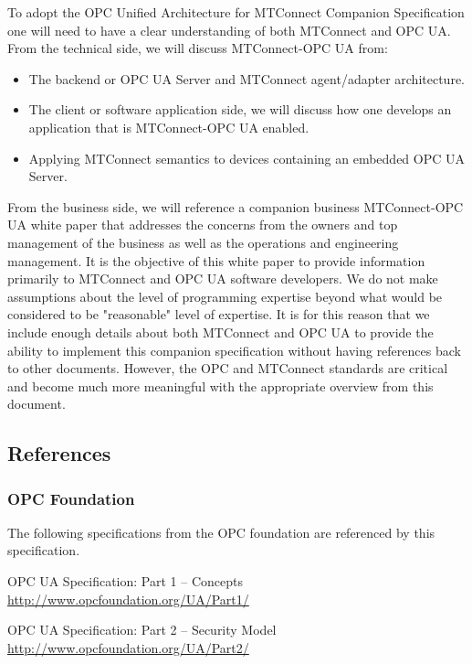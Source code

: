 \documentclass{mtconnect}	%
\begin{document}
To adopt the OPC Unified Architecture for MTConnect Companion Specification one will need to have a clear understanding of both MTConnect and OPC UA. From the technical side, we will discuss MTConnect-OPC UA from:

\begin{itemize}
    \item The backend or OPC UA Server and MTConnect agent/adapter architecture.
    \item The client or software application side, we will discuss how one develops an application that is MTConnect-OPC UA enabled.
    \item Applying MTConnect semantics to devices containing an embedded OPC UA Server.
\end{itemize}

From the business side, we will reference a companion business MTConnect-OPC UA white paper that addresses the concerns from the owners and top management of the business as well as the operations and engineering management. It is the objective of this white paper to provide information primarily to MTConnect and OPC UA software developers. We do not make assumptions about the level of programming expertise beyond what would be considered to be "reasonable" level of expertise. It is for this reason that we include enough details about both MTConnect and OPC UA to provide the ability to implement this companion specification without having references back to other documents. However, the OPC and MTConnect standards are critical and become much more meaningful with the appropriate overview from this document.

\subsection{References}

\subsubsection{OPC Foundation}

The following specifications from the OPC foundation are referenced by this specification.

\hang [UA Part 1]	OPC UA Specification: Part 1 -- Concepts \\
\url{http://www.opcfoundation.org/UA/Part1/}\label{doc:UA_Part_1}

\hang [UA Part 2]	OPC UA Specification: Part 2 -- Security Model \\
\url{http://www.opcfoundation.org/UA/Part2/}
\end{document}
